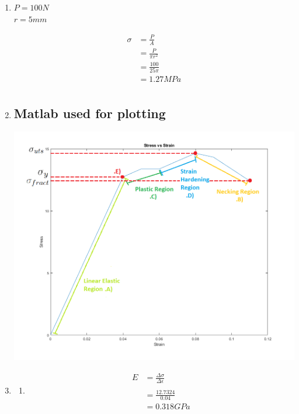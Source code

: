 \documentclass[a4paper,11pt]{article}
\begin{document}
\begin{enumerate}
    \item 
    $P = 100N$\\
    $r = 5mm$

    \begin{align*}
        \sigma &= \frac{P}{A}\\
        &= \frac{P}{\pi r^2}\\
        &= \frac{100}{25\pi}\\
        &= 1.27MPa\\
    \end{align*}

    \item 

    \subsection*{Matlab used for plotting}
    
    \vspace{15pt}
    \includegraphics[width= \textwidth ]{q5.png}


    \item 

    \begin{enumerate}
        \item 

        \begin{align*}
            E &= \frac{\Delta\sigma}{\Delta\epsilon}\\\\
            &= \frac{12.7324}{0.04}\\
            &= 0.318GPa
        \end{align*}


\end{enumerate}
\end{enumerate}
\end{document}
